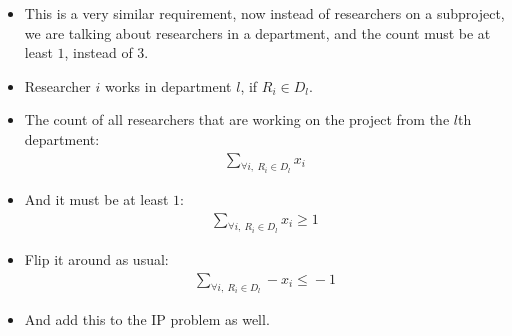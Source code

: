 

\begin{itemize}
    \item This is a very similar requirement, now instead of researchers on a subproject, we are talking about researchers in a department, and the count must be at least $1$, instead of $3$.
    \item Researcher $i$ works in department $l$, if $R_i \in{} D_l$.
    \item The count of all researchers that are working on the project from the $l$th department:
    \begin{align*}
        \sum\limits_{\forall{}i,~R_i\in{}D_l}x_i
    \end{align*}
    \item And it must be at least $1$:
    \begin{align*}
        \sum\limits_{\forall{}i,~R_i\in{}D_l}x_i \geq{} 1
    \end{align*}
    \item Flip it around as usual:
    \begin{align*}
        \sum\limits_{\forall{}i,~R_i\in{}D_l} -x_i \leq{} -1
    \end{align*}
    \item And add this to the IP problem as well.
\end{itemize}

